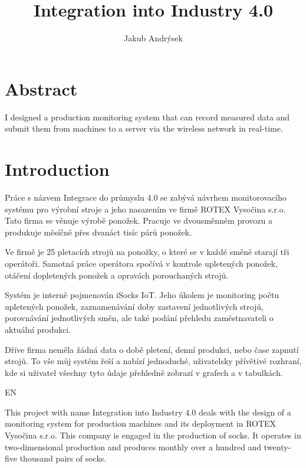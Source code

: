 \documentclass[12pt, a4paper]{article}
\title{Integration into Industry 4.0}
\author{Jakub Andrýsek}
\date{}
\begin{document}

\maketitle

\section*{Abstract}
I designed a production monitoring system that can record measured data and submit them from machines to a server via the wireless network in real-time.



\section*{Introduction}
Práce s názvem Integrace do průmyslu 4.0 se zabývá návrhem monitorovacího systému pro výrobní stroje a jeho nasazením ve firmě ROTEX Vysočina s.r.o.
Tato firma se věnuje výrobě ponožek.
Pracuje ve dvousměnném provozu a produkuje měsíčně přes dvanáct tisíc párů ponožek.

Ve firmě je 25 pletacích strojů na ponožky, o které se v každé směně starají tři operátoři.
Samotná práce operátora spočívá v kontrole upletených ponožek, otáčení dopletených ponožek a opravách porouchaných strojů.

Systém je interně pojmenován iSocks IoT.
Jeho úkolem je monitoring počtu upletených ponožek, zaznamenávání doby zastavení jednotlivých strojů, porovnávání jednotlivých směn, ale také podání přehledu zaměstnavateli o aktuální produkci.

Dříve firma neměla žádná data o době pletení, denní  produkci, nebo čase zapnutí strojů.
To vše  můj systém řeší  a nabízí jednoduché, uživatelsky přívětivé rozhraní, kde si uživatel všechny tyto údaje přehledně zobrazí v grafech a v tabulkách.

EN

This project with name Integration into Industry 4.0 deals with the design of a monitoring system for production machines and its deployment in ROTEX Vysočina s.r.o.
This company is engaged in the production of socks.
It operates in two-dimensional production and produces monthly over a hundred and twenty-five thousand pairs of socks.
\end{document}
